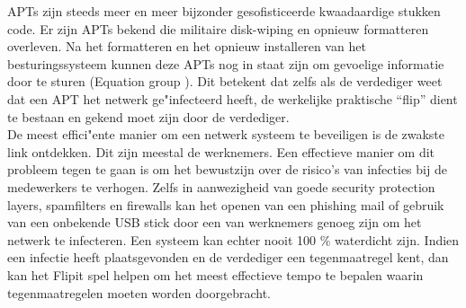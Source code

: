 \documentclass[master=cws, masteroption=vs,english]{kulemt}
\begin{document}
\begin{abstract*}
APTs zijn steeds meer en meer bijzonder gesofisticeerde kwaadaardige stukken code.  Er zijn APTs bekend die militaire disk-wiping en opnieuw formatteren overleven. Na het formatteren en het opnieuw installeren van het besturingssysteem kunnen deze APTs nog in staat zijn om gevoelige informatie door te sturen (Equation group \citep{Equation}). Dit betekent dat zelfs als de verdediger weet dat een APT het netwerk ge"infecteerd heeft, de werkelijke praktische ``flip'' dient te bestaan en gekend moet zijn door de verdediger. \\
De meest effici"ente manier om een netwerk systeem te beveiligen is de zwakste link ontdekken. Dit zijn meestal de werknemers. Een effectieve manier om dit probleem tegen te gaan is om het bewustzijn over de risico's van infecties bij de medewerkers te verhogen. Zelfs in aanwezigheid van goede security protection layers, spamfilters en firewalls kan het openen van een phishing mail of gebruik van een onbekende USB stick door een van werknemers genoeg zijn om het netwerk te infecteren. Een systeem kan echter nooit 100 \% waterdicht zijn. Indien een infectie heeft plaatsgevonden en de verdediger een tegenmaatregel kent, dan kan het Flipit spel helpen om het meest effectieve tempo te bepalen waarin tegenmaatregelen moeten worden doorgebracht.

%  
\end{abstract*}
\end{document}

